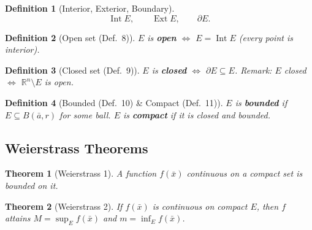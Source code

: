 \documentclass[12pt,a4paper]{article}
\newtheorem{definition}{Definition}
\newtheorem{theorem}{Theorem}
\begin{document}
\begin{definition}[Interior, Exterior, Boundary]
\[
  \operatorname{Int} E,\qquad \operatorname{Ext} E,\qquad \partial E.
\]
\end{definition}

\begin{definition}[Open set (Def.\ 8)]
$E$ is \textbf{open} $\iff$ $E = \operatorname{Int} E$ (every point is interior).
\end{definition}

\begin{definition}[Closed set (Def.\ 9)]
$E$ is \textbf{closed} $\iff$ $\partial E\subseteq E$.
\textit{Remark}: $E$ closed $\iff$ $\mathbb{R}^n\setminus E$ is open.
\end{definition}

\begin{definition}[Bounded (Def.\ 10) \& Compact (Def.\ 11)]
$E$ is \textbf{bounded} if $E\subseteq B(\bar{a},r)$ for some ball.
$E$ is \textbf{compact} if it is \emph{closed and bounded}.
\end{definition}

\begin{center}
\end{center}

\subsection*{Weierstrass Theorems}

\begin{theorem}[Weierstrass 1]
A function $f(\bar{x})$ continuous on a compact set is \emph{bounded} on it.
\end{theorem}

\begin{theorem}[Weierstrass 2]
If $f(\bar{x})$ is continuous on compact $E$, then $f$ attains
$M=\sup_E f(\bar{x})$ and $m=\inf_E f(\bar{x})$.
\end{theorem}
\end{document}
